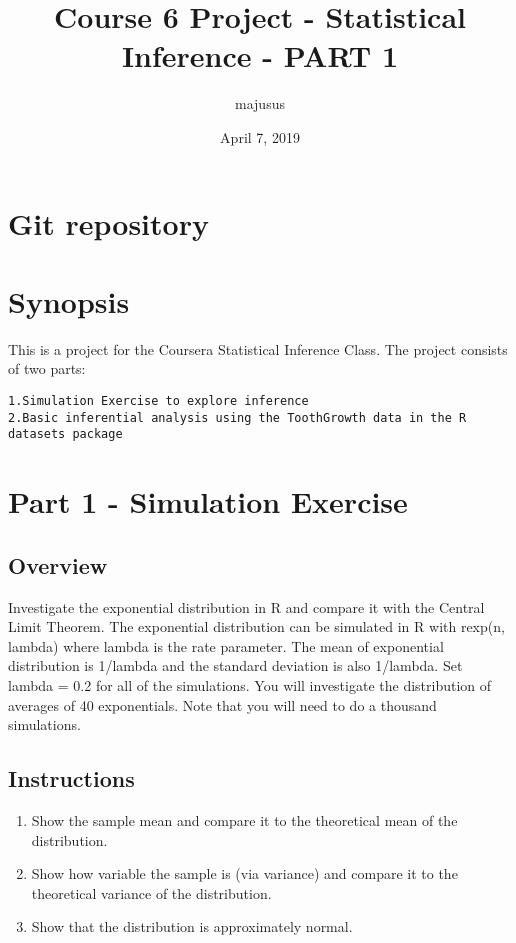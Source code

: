 \documentclass[]{article}
\title{Course 6 Project - Statistical Inference - PART 1}
\author{majusus}
\date{April 7, 2019}
\providecommand{\tightlist}{%
  \setlength{\itemsep}{0pt}\setlength{\parskip}{0pt}}
\begin{document}
\maketitle

\section{Git repository}\label{git-repository}

\section{Synopsis}\label{synopsis}

This is a project for the Coursera Statistical Inference Class. The
project consists of two parts:

\begin{verbatim}
1.Simulation Exercise to explore inference
2.Basic inferential analysis using the ToothGrowth data in the R datasets package 
\end{verbatim}

\section{Part 1 - Simulation
Exercise}\label{part-1---simulation-exercise}

\subsection{Overview}\label{overview}

Investigate the exponential distribution in R and compare it with the
Central Limit Theorem. The exponential distribution can be simulated in
R with rexp(n, lambda) where lambda is the rate parameter. The mean of
exponential distribution is 1/lambda and the standard deviation is also
1/lambda. Set lambda = 0.2 for all of the simulations. You will
investigate the distribution of averages of 40 exponentials. Note that
you will need to do a thousand simulations.

\subsection{Instructions}\label{instructions}

\begin{enumerate}
\def\labelenumi{\arabic{enumi}.}
\tightlist
\item
  Show the sample mean and compare it to the theoretical mean of the
  distribution.
\item
  Show how variable the sample is (via variance) and compare it to the
  theoretical variance of the distribution.
\item
  Show that the distribution is approximately normal.
\end{enumerate}
\end{document}
